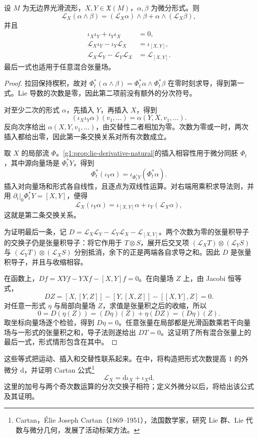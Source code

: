\begin{proposition}
	\label{g1:prop:cartan-insertion-identities}
	设 \(M\) 为无边界光滑流形，\(X,Y\in\mathfrak X(M)\)，\(\alpha,\beta\) 为微分形式。则
	\[
		\mathcal L_X(\alpha\wedge\beta)
		=(\mathcal L_X\alpha)\wedge\beta+\alpha\wedge(\mathcal L_X\beta),
	\]
	并且
	\begin{align*}
		\iota_X\iota_Y+\iota_Y\iota_X&=0,\\
		\mathcal L_X\iota_Y-\iota_Y\mathcal L_X&=\iota_{[X,Y]},\\
		\mathcal L_X\mathcal L_Y-\mathcal L_Y\mathcal L_X&=\mathcal L_{[X,Y]}.
	\end{align*}
	最后一式也适用于任意混合张量场。
\end{proposition}
\begin{proof}
	拉回保持楔积，故对 \(\Phi_t^*(\alpha\wedge\beta)=\Phi_t^*\alpha\wedge\Phi_t^*\beta\) 在零时刻求导，得到第一式。Lie 导数的次数是零，因此第二项前没有额外的分次符号。

	对至少二次的形式 \(\alpha\)，先插入 \(Y\)，再插入 \(X\)，得到
	\[
		(\iota_X\iota_Y\alpha)(v_1,\ldots)=\alpha(Y,X,v_1,\ldots).
	\]
	反向次序给出 \(\alpha(X,Y,v_1,\ldots)\)，由交替性二者相加为零。次数为零或一时，两次插入都给出零，因此第一条交换关系对所有次数成立。

	取 \(X\) 的局部流 \(\Phi\)。\cref{g1:prop:lie-derivative-natural}的插入相容性用于微分同胚 \(\Phi_t\)，其中源向量场是 \(\Phi_t^*Y\)，得到
	\[
		\Phi_t^*(\iota_Y\alpha)
		=\iota_{\Phi_t^*Y}(\Phi_t^*\alpha).
	\]
	插入对向量场和形式各自线性，且逐点为双线性运算。对右端用乘积求导法则，并用 \(\left.\partial_t\right|_0\Phi_t^*Y=[X,Y]\)，便得
	\[
		\mathcal L_X(\iota_Y\alpha)
		=\iota_{[X,Y]}\alpha+\iota_Y(\mathcal L_X\alpha),
	\]
	这就是第二条交换关系。

	为证明最后一条，记 \(D=\mathcal L_X\mathcal L_Y-\mathcal L_Y\mathcal L_X-\mathcal L_{[X,Y]}\)。两个次数为零的张量积导子的交换子仍是张量积导子：将它作用于 \(T\otimes S\)，展开后交叉项 \((\mathcal L_XT)\otimes(\mathcal L_YS)\) 与 \((\mathcal L_YT)\otimes(\mathcal L_XS)\) 分别抵消，余下的正是两端各自求导之和。因此 \(D\) 是张量积导子，并且与收缩相容。

	在函数上，\(Df=XYf-YXf-[X,Y]f=0\)。在向量场 \(Z\) 上，由 Jacobi 恒等式，
	\[
		DZ=[X,[Y,Z]]-[Y,[X,Z]]-[[X,Y],Z]=0.
	\]
	对任意一形式 \(\eta\) 与局部向量场 \(Z\)，求值是张量积之后的收缩，所以
	\[
		0=D(\eta(Z))=(D\eta)(Z)+\eta(DZ)=(D\eta)(Z).
	\]
	取坐标向量场逐个检验，得到 \(D\eta=0\)。任意张量在局部都是光滑函数乘若干向量场与一形式的张量积之和，导子法则遂给出 \(DT=0\)。这证明了所有混合张量上的最后一式，形式情形包含在其中。
\end{proof}

这些等式把运动、插入和交替性联系起来。在中，将构造把形式次数提高 \(1\) 的外微分 \(\mathrm{d}\)，并证明 Cartan 公式\footnote{Cartan，Élie Joseph Cartan（1869--1951），法国数学家，研究 Lie 群、Lie 代数与微分几何，发展了活动标架方法。}
\[
	\mathcal L_X=\mathrm{d}\iota_X+\iota_X\mathrm{d}.
\]
这里的加号与两个奇次数运算的分次交换子相符；定义外微分以后，将给出该公式及其证明。
